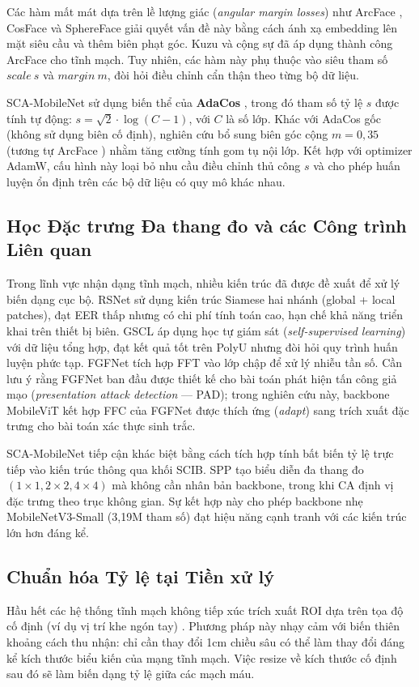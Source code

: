 \documentclass[12pt,a4paper]{article}
\begin{document}
Các hàm mất mát dựa trên lề lượng giác (\textit{angular margin losses}) như ArcFace \cite{b14}, CosFace \cite{b15} và SphereFace \cite{b16} giải quyết vấn đề này bằng cách ánh xạ embedding lên mặt siêu cầu và thêm biên phạt góc. Kuzu và cộng sự \cite{b2} đã áp dụng thành công ArcFace cho tĩnh mạch. Tuy nhiên, các hàm này phụ thuộc vào siêu tham số $scale~s$ và $margin~m$, đòi hỏi điều chỉnh cẩn thận theo từng bộ dữ liệu.

SCA-MobileNet sử dụng biến thể của \textbf{AdaCos} \cite{b11}, trong đó tham số tỷ lệ $s$ được tính tự động: $s = \sqrt{2} \cdot \log(C - 1)$, với $C$ là số lớp. Khác với AdaCos gốc (không sử dụng biên cố định), nghiên cứu bổ sung biên góc cộng $m = 0{,}35$ (tương tự ArcFace \cite{b14}) nhằm tăng cường tính gom tụ nội lớp. Kết hợp với optimizer AdamW, cấu hình này loại bỏ nhu cầu điều chỉnh thủ công $s$ và cho phép huấn luyện ổn định trên các bộ dữ liệu có quy mô khác nhau.

\subsection{Học Đặc trưng Đa thang đo và các Công trình Liên quan}
Trong lĩnh vực nhận dạng tĩnh mạch, nhiều kiến trúc đã được đề xuất để xử lý biến dạng cục bộ. RSNet \cite{b4} sử dụng kiến trúc Siamese hai nhánh (global + local patches), đạt EER thấp nhưng có chi phí tính toán cao, hạn chế khả năng triển khai trên thiết bị biên. GSCL \cite{b3} áp dụng học tự giám sát (\textit{self-supervised learning}) với dữ liệu tổng hợp, đạt kết quả tốt trên PolyU nhưng đòi hỏi quy trình huấn luyện phức tạp. FGFNet \cite{b5} tích hợp FFT vào lớp chập để xử lý nhiễu tần số. Cần lưu ý rằng FGFNet ban đầu được thiết kế cho bài toán phát hiện tấn công giả mạo (\textit{presentation attack detection} --- PAD); trong nghiên cứu này, backbone MobileViT kết hợp FFC của FGFNet được thích ứng (\textit{adapt}) sang trích xuất đặc trưng cho bài toán xác thực sinh trắc.

SCA-MobileNet tiếp cận khác biệt bằng cách tích hợp tính bất biến tỷ lệ trực tiếp vào kiến trúc thông qua khối SCIB. SPP \cite{b8} tạo biểu diễn đa thang đo $(1\times 1, 2\times 2, 4\times 4)$ mà không cần nhân bản backbone, trong khi CA \cite{b7} định vị đặc trưng theo trục không gian. Sự kết hợp này cho phép backbone nhẹ MobileNetV3-Small (3,19M tham số) đạt hiệu năng cạnh tranh với các kiến trúc lớn hơn đáng kể.

\subsection{Chuẩn hóa Tỷ lệ tại Tiền xử lý}
Hầu hết các hệ thống tĩnh mạch không tiếp xúc trích xuất ROI dựa trên tọa độ cố định (ví dụ vị trí khe ngón tay) \cite{b1}. Phương pháp này nhạy cảm với biến thiên khoảng cách thu nhận: chỉ cần thay đổi 1cm chiều sâu có thể làm thay đổi đáng kể kích thước biểu kiến của mạng tĩnh mạch. Việc resize về kích thước cố định sau đó sẽ làm biến dạng tỷ lệ giữa các mạch máu.
\end{document}
